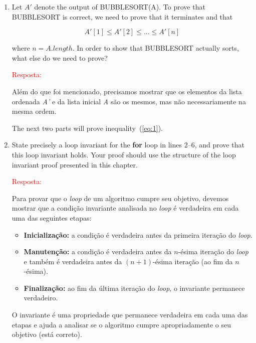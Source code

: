 \documentclass{article}
\begin{document}
\begin{enumerate}[label=\Alph*]
  \item Let $A'$ denote the output of BUBBLESORT(A). To prove that BUBBLESORT is correct, we need to prove that it terminates and that
  
  \begin{equation} \label{eq:1}
    A'[1] \leq A'[2] \leq ... \leq A'[n]
  \end{equation}
  
  where $n = A.length$. In order to show that BUBBLESORT actually sorts, what else do we need to prove?
  
  \vspace{2cm} 
  \textcolor{red}{Resposta:}
  
  Além do que foi mencionado, precisamos mostrar que os elementos da lista ordenada \textit{A'} e da lista inicial \textit{A} são os mesmos, mas não necessariamente na mesma ordem. 
  
  \vspace{\baselineskip}
  The next two parts will prove inequality~(\ref{eq:1}).
  
  \item State precisely a loop invariant for the \textbf{for} loop in lines 2–6, and prove that this loop invariant holds. Your proof should use the structure of the loop invariant proof presented in this chapter.
  
  \textcolor{red}{Resposta:}
  
  Para provar que o \textit{loop} de um algoritmo cumpre seu objetivo, devemos mostrar que a condição invariante analisada no \textit{loop} é verdadeira em cada uma das seguintes etapas:
  
  \begin{itemize}
      \item \textbf{Inicialização:} a condição é verdadeira antes da primeira iteração do \textit{loop}.
      
      \item \textbf{Manutenção:} a condição é verdadeira antes da $n$-ésima iteração do \textit{loop} e também é verdadeira antes da $(n+1)$-ésima iteração (ao fim da $n$-ésima).  
      
      \item \textbf{Finalização:} ao fim da última iteração do \textit{loop}, o invariante permanece verdadeiro.
  \end{itemize}
  
  O invariante é uma propriedade que permanece verdadeira em cada uma das etapas e ajuda a analisar se o algoritmo cumpre apropriadamente o seu objetivo (está correto).
  

\end{enumerate}
\end{document}
